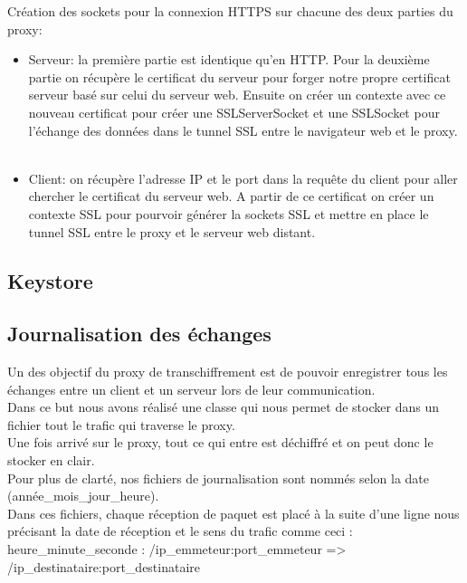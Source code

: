 \documentclass[a4paper,11pt,french]{report}
\begin{document}
Création des sockets pour la connexion HTTPS sur chacune des deux parties du proxy:
\begin{itemize}
  \item Serveur: la première partie est identique qu'en HTTP. Pour la deuxième 
  partie on récupère le certificat du serveur pour forger notre propre 
  certificat serveur basé sur celui du serveur web. Ensuite on créer un contexte 
  avec ce nouveau certificat pour créer une SSLServerSocket et une SSLSocket 
  pour l'échange des données dans le tunnel SSL entre le navigateur web et le 
  proxy. ~~\\
  
  \item Client: on récupère l'adresse IP et le port dans la requête du client 
  pour aller chercher le certificat du serveur web. A partir de ce certificat on 
  créer un contexte SSL pour pourvoir générer la sockets SSL et mettre en place 
  le tunnel SSL entre le proxy et le serveur web distant.
\end{itemize}

\subsection{Keystore}


\subsection{Journalisation des échanges}
Un des objectif du proxy de transchiffrement est de pouvoir enregistrer tous les 
échanges entre un client et un serveur lors de leur communication.~~\\
Dans ce but nous avons réalisé une classe qui nous permet de stocker dans un fichier tout le trafic qui traverse le proxy.~~\\

Une fois arrivé sur le proxy, tout ce qui entre est déchiffré et on peut donc le stocker en clair.~~\\

Pour plus de clarté, nos fichiers de journalisation sont nommés selon la date (année\_mois\_jour\_heure).~~\\

Dans ces fichiers, chaque réception de paquet est placé à la suite d'une ligne nous précisant la date de réception et le sens du trafic comme ceci : ~~\\

heure\_minute\_seconde : /ip\_emmeteur:port\_emmeteur => /ip\_destinataire:port\_destinataire~~\\
\end{document}
